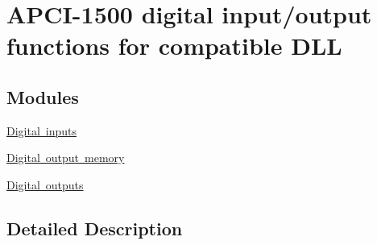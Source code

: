 \hypertarget{group___dig_i_o_cmp_d_l_l}{}\section{A\+P\+C\+I-\/1500 digital input/output functions for compatible D\+LL}
\label{group___dig_i_o_cmp_d_l_l}
\subsection*{Modules}
\begin{DoxyCompactItemize}
\item 
\mbox{\hyperlink{group___dig_inp_cmp_d_l_l}{Digital inputs}}
\item 
\mbox{\hyperlink{group___dig_out_memory_cmp_d_l_l}{Digital output memory}}
\item 
\mbox{\hyperlink{group___dig_i_out_cmp_d_l_l}{Digital outputs}}
\end{DoxyCompactItemize}


\subsection{Detailed Description}
